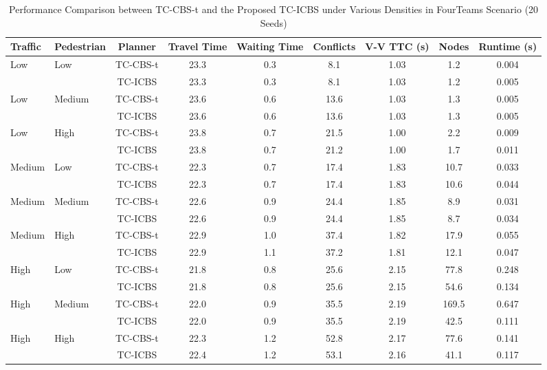 \begin{table}[t]
\centering
\caption{Performance Comparison between TC-CBS-t and the Proposed TC-ICBS under Various Densities in FourTeams Scenario (20 Seeds)}
\begin{tabular}{llccccccc}
\hline
Traffic & Pedestrian & Planner & Travel Time & Waiting Time & Conflicts & V-V TTC (s) & Nodes & Runtime (s) \\
\hline
Low & Low & TC-CBS-t & 23.3 & 0.3 & 8.1 & 1.03 & 1.2 & 0.004 \\
 & & TC-ICBS & 23.3 & 0.3 & 8.1 & 1.03 & 1.2 & 0.005 \\
\hline
Low & Medium & TC-CBS-t & 23.6 & 0.6 & 13.6 & 1.03 & 1.3 & 0.005 \\
 & & TC-ICBS & 23.6 & 0.6 & 13.6 & 1.03 & 1.3 & 0.005 \\
\hline
Low & High & TC-CBS-t & 23.8 & 0.7 & 21.5 & 1.00 & 2.2 & 0.009 \\
 & & TC-ICBS & 23.8 & 0.7 & 21.2 & 1.00 & 1.7 & 0.011 \\
\hline
Medium & Low & TC-CBS-t & 22.3 & 0.7 & 17.4 & 1.83 & 10.7 & 0.033 \\
 & & TC-ICBS & 22.3 & 0.7 & 17.4 & 1.83 & 10.6 & 0.044 \\
\hline
Medium & Medium & TC-CBS-t & 22.6 & 0.9 & 24.4 & 1.85 & 8.9 & 0.031 \\
 & & TC-ICBS & 22.6 & 0.9 & 24.4 & 1.85 & 8.7 & 0.034 \\
\hline
Medium & High & TC-CBS-t & 22.9 & 1.0 & 37.4 & 1.82 & 17.9 & 0.055 \\
 & & TC-ICBS & 22.9 & 1.1 & 37.2 & 1.81 & 12.1 & 0.047 \\
\hline
High & Low & TC-CBS-t & 21.8 & 0.8 & 25.6 & 2.15 & 77.8 & 0.248 \\
 & & TC-ICBS & 21.8 & 0.8 & 25.6 & 2.15 & 54.6 & 0.134 \\
\hline
High & Medium & TC-CBS-t & 22.0 & 0.9 & 35.5 & 2.19 & 169.5 & 0.647 \\
 & & TC-ICBS & 22.0 & 0.9 & 35.5 & 2.19 & 42.5 & 0.111 \\
\hline
High & High & TC-CBS-t & 22.3 & 1.2 & 52.8 & 2.17 & 77.6 & 0.141 \\
 & & TC-ICBS & 22.4 & 1.2 & 53.1 & 2.16 & 41.1 & 0.117 \\
\hline
\end{tabular}
\label{tab:fourteams}
\end{table}
